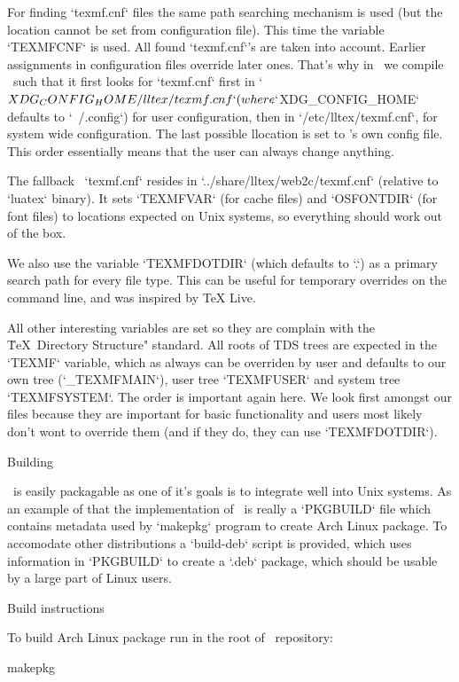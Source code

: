 For finding `texmf.cnf` files the same path searching mechanism is used (but
the location cannot be set from configuration file). This time the variable
`TEXMFCNF` is used. All found `texmf.cnf`'s are taken into account. Earlier
assignments in configuration files override later ones. That's why in \LLTeX\
we compile \LuaTeX\ such that it first looks for `texmf.cnf` first in
`$XDG_CONFIG_HOME/lltex/texmf.cnf` (where `$XDG_CONFIG_HOME` defaults to
`~/.config`) for user configuration, then in `/etc/lltex/texmf.cnf`, for system
wide configuration. The last possible llocation is set to \LLTeX's own config
file. This order essentially means that the user can always change anything.

The fallback \LLTeX\ `texmf.cnf` resides in `../share/lltex/web2c/texmf.cnf`
(relative to `luatex` binary). It sets `TEXMFVAR` (for cache files) and
`OSFONTDIR` (for font files) to locations expected on Unix systems, so
everything should work out of the box.

We also use the variable `TEXMFDOTDIR` (which defaults to `.`) as a primary
search path for every file type. This can be useful for temporary overrides on
the command line, and was inspired by TeX Live.

All other interesting variables are set so they are complain with the \"\TeX\
Directory Structure" standard. All roots of TDS trees are expected in the
`TEXMF` variable, which as always can be overriden by user and defaults to our
own tree (`_TEXMFMAIN`), user tree `TEXMFUSER` and system tree `TEXMFSYSTEM`.
The order is important again here. We look first amongst our files because they
are important for basic functionality and users most likely don't wont to
override them (and if they do, they can use `TEXMFDOTDIR`).

\sec Building \LLTeX

\LLTeX\ is easily packagable as one of it's goals is to integrate well into
Unix systems. As an example of that the implementation of \LLTeX\ is really a
`PKGBUILD` file which contains metadata used by `makepkg` program to create
Arch Linux package. To accomodate other distributions a `build-deb` script is
provided, which uses information in `PKGBUILD` to create a `.deb` package,
which should be usable by a large part of Linux users.

\secc[build] Build instructions

To build Arch Linux package run in the root of \LLTeX\ repository:

\begtt
makepkg
\endtt

